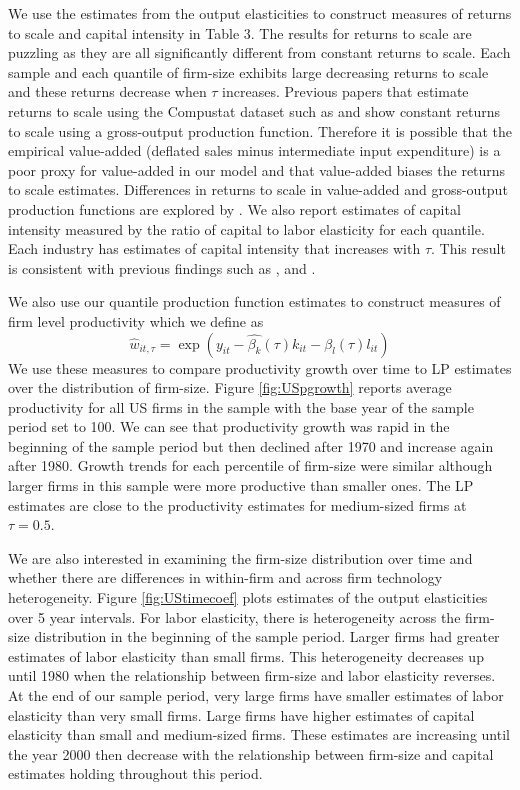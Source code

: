 \documentclass[11pt]{article}
\begin{document}
We use the estimates from the output elasticities to construct measures of returns to scale and capital intensity in Table 3. The results for returns to scale are puzzling as they are all significantly different from constant returns to scale. Each sample and each quantile of firm-size exhibits large decreasing returns to scale and these returns decrease when $\tau$ increases. Previous papers that estimate returns to scale using the Compustat dataset such as \cite{Keller2009} and \cite{mert} show constant returns to scale using a gross-output production function. Therefore it is possible that the empirical value-added (deflated sales minus intermediate input expenditure) is a poor proxy for value-added in our model and that value-added biases the returns to scale estimates. Differences in returns to scale in value-added and gross-output production functions are explored by \cite{Basu1997}. We also report estimates of capital intensity measured by the ratio of capital to labor elasticity for each quantile. Each industry has estimates of capital intensity that increases with $\tau$. This result is consistent with previous findings such as \cite{Holmes2008}, \cite{Kumar1999} and \cite{mert}.




We also use our quantile production function estimates to construct measures of firm level productivity which we define as
\begin{equation}
\hat{w}_{it,\tau}=\exp(y_{it}-\hat{\beta_{k}}(\tau)k_{it}-\hat{\beta_{l}}(\tau)l_{it})
\end{equation}
We use these measures to compare productivity growth over time to LP estimates over the distribution of firm-size. Figure \ref{fig:USpgrowth} reports average productivity for all US firms in the sample with the base year of the sample period set to 100. We can see that productivity growth was rapid in the beginning of the sample period but then declined after 1970 and increase again after 1980. Growth trends for each percentile of firm-size were similar although larger firms in this sample were more productive than smaller ones. The LP estimates are close to the productivity estimates for medium-sized firms at $\tau=0.5$.

We are also interested in examining the firm-size distribution over time and whether there are differences in within-firm and across firm technology heterogeneity. Figure \ref{fig:UStimecoef} plots estimates of the output elasticities over 5 year intervals. For labor elasticity, there is heterogeneity across the firm-size distribution in the beginning of the sample period. Larger firms had greater estimates of labor elasticity than small firms. This heterogeneity decreases up until 1980 when the relationship between firm-size and labor elasticity reverses. At the end of our sample period, very large firms have smaller estimates of labor elasticity than very small firms. Large firms have higher estimates of capital elasticity than small and medium-sized firms. These estimates are increasing until the year 2000 then decrease with the relationship between firm-size and capital estimates holding throughout this period.
\end{document}
